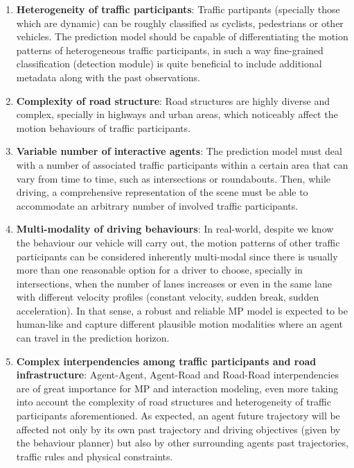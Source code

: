 \begin{enumerate}
	\item \textbf{Heterogeneity of traffic participants}: Traffic partipants (specially those which are dynamic) can be roughly classified as cyclists, pedestrians or other vehicles. The prediction model should be capable of differentiating the motion patterns of heterogeneous traffic participants, in such a way fine-grained classification (detection module) is quite beneficial to include additional metadata along with the past observations.
	\item \textbf{Complexity of road structure}: Road structures are highly diverse and complex, specially in highways and urban areas, which noticeably affect the motion behaviours of traffic participants.
	\item \textbf{Variable number of interactive agents}: The prediction model must deal with a number of associated traffic participants within a certain area that can vary from time to time, such as intersections or roundabouts. Then, while driving, a comprehensive representation of the scene must be able to accommodate an arbitrary number of involved traffic participants.
	\item \textbf{Multi-modality of driving behaviours}: In real-world, despite we know the behaviour our vehicle will carry out, the motion patterns of other traffic participants can be considered inherently multi-modal since there is usually more than one reasonable option for a driver to choose, specially in intersections, when the number of lanes increases or even in the same lane with different velocity profiles (constant velocity, sudden break, sudden acceleration). In that sense, a robust and reliable \ac{MP} model is expected to be human-like and capture different plausible motion modalities where an agent can travel in the prediction horizon.
	\item \textbf{Complex interpendencies among traffic participants and road infrastructure}: Agent-Agent, Agent-Road and Road-Road interpendencies are of great importance for \ac{MP} and interaction modeling, even more taking into account the complexity of road structures and heterogeneity of traffic participants aforementioned. As expected, an agent future trajectory will be affected not only by its own past trajectory and driving objectives (given by the behaviour planner) but also by other surrounding agents past trajectories, traffic rules and physical constraints.
\end{enumerate}

